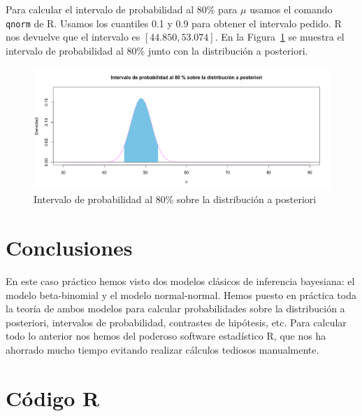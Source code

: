 \documentclass[12pt,a4paper,twoside,openright,titlepage,final]{article}
\begin{document}
Para calcular el intervalo de probabilidad al 80\% para $\mu$ usamos el comando \texttt{qnorm} de R. Usamos los cuantiles 0.1 y 0.9 para obtener el intervalo pedido. R nos devuelve que el intervalo es $[44.850, 53.074]$. En la Figura~\ref{fig:intervalo_probabilidad_normal} se muestra el intervalo de probabilidad al 80\% junto con la distribución a posteriori.

\begin{figure}[tbph!]
\centering
\includegraphics[width=0.9\linewidth]{./imagenes/intervalo_probabilidad_normal}
\caption{Intervalo de probabilidad al 80\% sobre la distribución a posteriori}
\label{fig:intervalo_probabilidad_normal}
\end{figure}

\section{Conclusiones}

En este caso práctico hemos visto dos modelos clásicos de inferencia bayesiana: el modelo beta-binomial y el modelo normal-normal. Hemos puesto en práctica toda la teoría de ambos modelos para calcular probabilidades sobre la distribución a posteriori, intervalos de probabilidad, contrastes de hipótesis, etc. Para calcular todo lo anterior nos hemos del poderoso software estadístico R, que nos ha ahorrado mucho tiempo evitando realizar cálculos tediosos manualmente. 

\newpage

\section{Código R}


\end{document}
